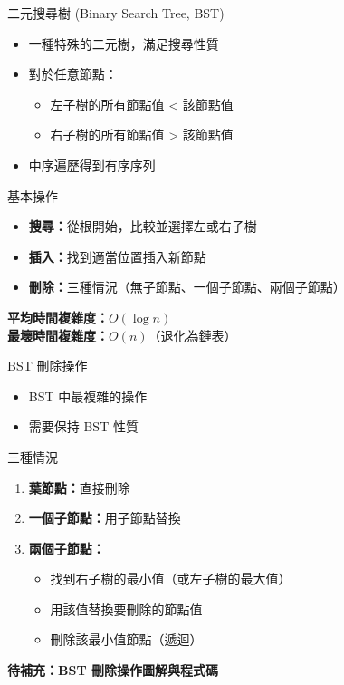 \documentclass{beamer}
\begin{document}
\begin{frame}{二元搜尋樹 (Binary Search Tree, BST)}
\begin{itemize}
    \item 一種特殊的二元樹，滿足搜尋性質
    \item 對於任意節點：
    \begin{itemize}
        \item 左子樹的所有節點值 < 該節點值
        \item 右子樹的所有節點值 > 該節點值
    \end{itemize}
    \item 中序遍歷得到有序序列
\end{itemize}

\vspace{1em}
\begin{block}{基本操作}
\begin{itemize}
    \item \textbf{搜尋：}從根開始，比較並選擇左或右子樹
    \item \textbf{插入：}找到適當位置插入新節點
    \item \textbf{刪除：}三種情況（無子節點、一個子節點、兩個子節點）
\end{itemize}
\end{block}

\vspace{1em}
\textbf{平均時間複雜度：}$O(\log n)$\\
\textbf{最壞時間複雜度：}$O(n)$（退化為鏈表）
\end{frame}

\begin{frame}{BST 刪除操作}
\begin{itemize}
    \item BST 中最複雜的操作
    \item 需要保持 BST 性質
\end{itemize}

\vspace{1em}
\begin{block}{三種情況}
\begin{enumerate}
    \item \textbf{葉節點：}直接刪除
    \item \textbf{一個子節點：}用子節點替換
    \item \textbf{兩個子節點：}
    \begin{itemize}
        \item 找到右子樹的最小值（或左子樹的最大值）
        \item 用該值替換要刪除的節點值
        \item 刪除該最小值節點（遞迴）
    \end{itemize}
\end{enumerate}
\end{block}

\vspace{1em}
\textbf{待補充：BST 刪除操作圖解與程式碼}
\end{frame}
\end{document}
